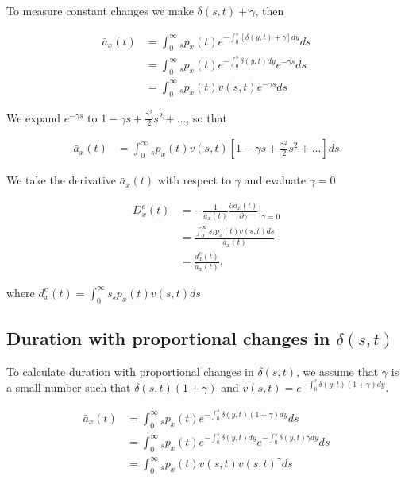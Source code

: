 \documentclass[12pt]{article}
\begin{document}
To measure constant changes we make $\delta(s,t)+\gamma$, then

\begin{equation}\label{eq:DurationConst1}
\begin{split}
\bar{a}_{x}(t) &= \int_0^\infty {}_sp_x(t) e^{- \int_{0}^{s} [\delta(y,t)+\gamma]dy}ds \\
&= \int_0^\infty {}_sp_x(t) e^{- \int_{0}^{s}\delta(y,t)dy}e^{-\gamma s}ds \\
&= \int_0^\infty {}_sp_x(t) {v}(s,t)e^{-\gamma s}ds
\end{split}
\end{equation}

We expand $e^{-\gamma s}$ to $1-\gamma s+\frac{\gamma^2}{2} s^{2} +...$, so that


\begin{equation}\label{eq:DurationConst1}
\begin{split}
\bar{a}_{x}(t) &= \int_0^\infty {}_sp_x(t) {v}(s,t)[1-\gamma s+\frac{\gamma^2}{2} s^{2} +...]ds
\end{split}
\end{equation}

We take the derivative $\bar{a}_{x}(t)$ with respect to $\gamma$ and evaluate $\gamma=0$


\begin{equation}\label{eq:DurationConst2}
\begin{split}
{D}^{c}_x(t)&=-\frac{1}{\bar{a}_x(t)}\frac{\partial \bar{a}_x(t)}{\partial \gamma} \bigg\rvert_{\gamma=0}\\
              &= \frac{\int_0^\infty s {}_sp_x(t) {v}(s,t)ds}{\bar{a}_x(t)} \\
              &= \frac{{d}^{c}_x(t)}{\bar{a}_x(t)},
\end{split}
\end{equation}

where ${d}^{c}_x(t)=\int_0^\infty s {}_sp_x(t) {v}(s,t)ds$



\subsection{Duration with proportional changes in $\delta(s,t)$} \label{sec:DurProp}

To calculate duration with proportional changes in $\delta(s,t)$, we assume that $\gamma$ is a small number such that $\delta(s,t)(1+\gamma)$ and  ${v}(s,t)=e^{-\int_0^{s}  \delta(y,t)(1+\gamma)dy}$.


\begin{equation}\label{eq:DurationProp1}
\begin{split}
\bar{a} _x(t) &= \int_0^\infty {}_sp_x(t) e^{-\int_0^{s}\delta(y,t)(1+\gamma)dy}ds \\
&= \int_0^\infty {}_sp_x(t) e^{-\int_0^{s}\delta(y,t)dy}e^{-\int_0^{s}\delta(y,t)\gamma dy}ds \\
&= \int_0^\infty {}_sp_x(t) v(s,t)v(s,t)^{\gamma}ds \\
\end{split}
\end{equation}
\end{document}
